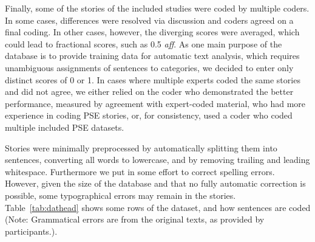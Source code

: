 \documentclass[man,a4paper,mask]{apa6}\usepackage[]{graphicx}\usepackage[]{color}
\begin{document}
Finally, some of the stories of the included studies were coded by multiple coders. In some cases, differences were resolved via discussion and coders agreed on a final coding. In other cases, however, the diverging scores were averaged, which could lead to fractional scores, such as 0.5 \emph{aff}. As one main purpose of the database is to provide training data for automatic text analysis, which requires unambiguous assignments of sentences to categories, we decided to enter only distinct scores of 0 or 1. In cases where multiple experts coded the same stories and did not agree, we either relied on the coder who demonstrated the better performance, measured by agreement with expert-coded material, who had more experience in coding PSE stories, or, for consistency, used a coder who coded multiple included PSE datasets.

Stories were minimally preprocessed by automatically splitting them into sentences, converting all words to lowercase, and by removing trailing and leading whitespace. Furthermore we put in some effort to correct spelling errors. However, given the size of the database and that no fully automatic correction is possible, some typographical errors may remain in the stories. Table~\ref{tab:dathead} shows some rows of the dataset, and how sentences are coded (Note: Grammatical errors are from the original texts, as provided by participants.).
\end{document}
